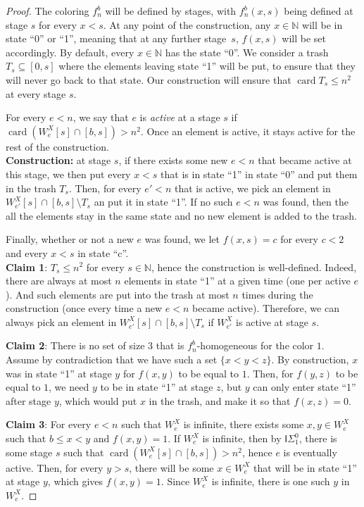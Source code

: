 \documentclass{article}
\newcommand{\ISig}{\mathsf{I}\Sigma^0}
\newcommand{\NN}[0]{\mathbb{N}}
\newcommand{\card}{\operatorname{card}}
\def\qt#1{``#1''}%
\numberwithin{theorem}{section}
\begin{document}
\begin{proof}
The coloring $f_n^b$ will be defined by stages, with $f_n^b(x,s)$ being defined at stage $s$ for every $x < s$. At any point of the construction, any $x \in \NN$ will be in state \qt{0} or \qt{1}, meaning that at any further stage~$s$, $f(x, s)$ will be set accordingly. By default, every $x \in \NN$ has the state \qt{0}. We consider a trash $T_s \subseteq [0,s]$ where the elements leaving state \qt{1} will be put, to ensure that they will never go back to that state. Our construction will ensure that $\card T_s \leq n^2$ at every stage $s$.

For every $e < n$, we say that $e$ is \emph{active} at a stage $s$ if $\card (W^X_e[s] \cap [b,s]) > n^2$. Once an element is active, it stays active for the rest of the construction. \\

\textbf{Construction:} at stage $s$, if there exists some new $e < n$ that became active at this stage, we then put every $x < s$ that is in state \qt{1} in state \qt{0} and put them in the trash $T_s$. Then, for every $e' < n$ that is active, we pick an element in $W^X_{e'}[s] \cap [b,s] \setminus T_s$ an put it in state \qt{1}. If no such $e < n$ was found, then the all the elements stay in the same state and no new element is added to the trash.

Finally, whether or not a new $e$ was found, we let $f(x,s) = c$ for every $c < 2$ and every $x < s$ in state \qt{c}.   \\

\textbf{Claim 1}: $T_s \leq n^2$ for every $s \in \NN$, hence the construction is well-defined. Indeed, there are always at most $n$ elements in state \qt{1} at a given time (one per active $e$). And such elements are put into the trash at most $n$ times during the construction (once every time a new $e <n$ became active). Therefore, we can always pick an element in $W^X_{e'}[s] \cap [b,s] \setminus T_s$ if $W^X_{e'}$ is active at stage $s$.
\smallskip

\textbf{Claim 2}: There is no set of size $3$ that is $f_n^b$-homogeneous for the color $1$. Assume by contradiction that we have such a set $\{x < y < z\}$. By construction, $x$ was in state \qt{1} at stage $y$ for $f(x,y)$ to be equal to $1$. Then, for $f(y,z)$ to be equal to $1$, we need $y$ to be in state \qt{1} at stage $z$, but $y$ can only enter state \qt{1} after stage $y$, which would put $x$ in the trash, and make it so that $f(x,z) = 0$.
\smallskip

\textbf{Claim 3}: For every $e < n$ such that $W^X_e$ is infinite, there exists some $x,y \in W^X_e$ such that $b \leq x < y$ and $f(x,y) = 1$.
If $W^X_e$ is infinite, then by $\ISig_1$, there is some stage $s$ such that $\card(W^X_e[s] \cap [b,s]) > n^2$, hence $e$ is eventually active. Then, for every $y > s$, there will be some $x \in W^X_e$ that will be in state \qt{1} at stage $y$, which gives $f(x,y) = 1$. Since $W^X_e$ is infinite, there is one such $y$ in $W^X_e$.

\end{proof}
\end{document}
